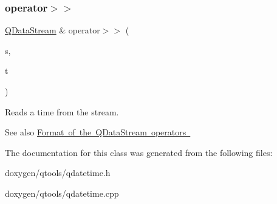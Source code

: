 \subsubsection{\texorpdfstring{operator$>$$>$}{operator>>}}
{\footnotesize\ttfamily \mbox{\hyperlink{class_q_data_stream}{Q\+Data\+Stream}} \& operator$>$$>$ (\begin{DoxyParamCaption}\item[{\mbox{\hyperlink{class_q_data_stream}{Q\+Data\+Stream}} \&}]{s,  }\item[{\mbox{\hyperlink{class_q_time}{Q\+Time}} \&}]{t }\end{DoxyParamCaption})\hspace{0.3cm}{\ttfamily [friend]}}

Reads a time from the stream.

\begin{DoxySeeAlso}{See also}
\mbox{\hyperlink{}{Format of the Q\+Data\+Stream operators }} 
\end{DoxySeeAlso}


The documentation for this class was generated from the following files\+:\begin{DoxyCompactItemize}
\item 
doxygen/qtools/qdatetime.\+h\item 
doxygen/qtools/qdatetime.\+cpp\end{DoxyCompactItemize}
